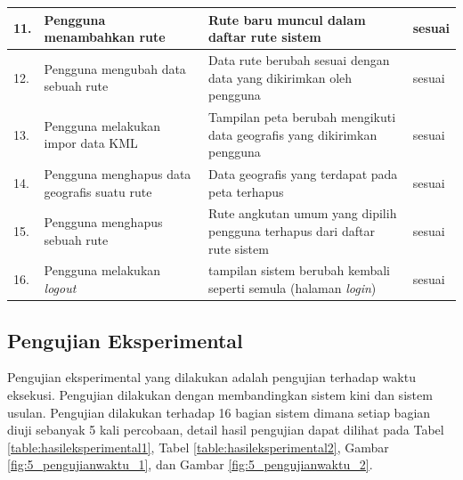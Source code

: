 \begin{table}[H]
\begin{tabular}{|p{0.37cm}| p{3.5cm}| p{7cm}| p{2.5cm}|}
		11. & Pengguna menambahkan rute & Rute baru muncul dalam daftar rute sistem & sesuai \\ \hline
		12. & Pengguna mengubah data sebuah rute & Data rute berubah sesuai dengan data yang dikirimkan oleh pengguna & sesuai  \\ \hline
		13. & Pengguna melakukan impor data KML & Tampilan peta berubah mengikuti data geografis yang dikirimkan pengguna & sesuai \\ \hline
		14. & Pengguna menghapus data geografis suatu rute & Data geografis yang terdapat pada peta terhapus & sesuai \\ \hline
		15. & Pengguna menghapus sebuah rute & Rute angkutan umum yang dipilih pengguna terhapus dari daftar rute sistem & sesuai  \\ \hline
		16. & Pengguna melakukan \textit{logout} & tampilan sistem berubah kembali seperti semula (halaman \textit{login}) & sesuai  \\ \hline
		\end{tabular}
	\label{table:hasilfungsional}
\end{table}

\subsection{Pengujian Eksperimental}
\label{sec:pengujianeksperimental}
Pengujian eksperimental yang dilakukan adalah pengujian terhadap waktu eksekusi. Pengujian dilakukan dengan membandingkan sistem kini dan sistem usulan. Pengujian dilakukan terhadap 16 bagian sistem dimana setiap bagian diuji sebanyak 5 kali percobaan, detail hasil pengujian dapat dilihat pada Tabel \ref{table:hasileksperimental1}, Tabel \ref{table:hasileksperimental2}, Gambar \ref{fig:5_pengujianwaktu_1}, dan Gambar \ref{fig:5_pengujianwaktu_2}.


